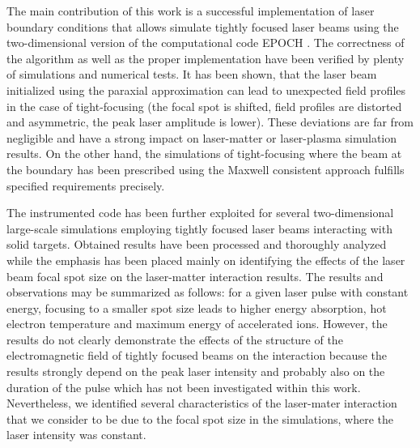 The main contribution of this work is a successful implementation of laser boundary conditions that allows simulate tightly focused laser beams using the two-dimensional version of the computational code EPOCH \cite{bennett}. The correctness of the algorithm as well as the proper implementation have been verified by plenty of simulations and numerical tests. It has been shown, that the laser beam initialized using the paraxial approximation can lead to unexpected field profiles in the case of tight-focusing (the focal spot is shifted, field profiles are distorted and asymmetric, the peak laser amplitude is lower). These deviations are far from negligible and have a strong impact on laser-matter or laser-plasma simulation results. On the other hand, the simulations of tight-focusing where the beam at the boundary has been prescribed using the Maxwell consistent approach \cite{Thiele2016} fulfills specified requirements precisely.

The instrumented code has been further exploited for several two-dimensional large-scale simulations employing tightly focused laser beams interacting with solid targets. Obtained results have been processed and thoroughly analyzed while the emphasis has been placed mainly on identifying the effects of the laser beam focal spot size on the laser-matter interaction results. The results and observations may be summarized as follows: for a given laser pulse with constant energy, focusing to a smaller spot size leads to higher energy absorption, hot electron temperature and maximum energy of accelerated ions. However, the results do not clearly demonstrate the effects of the structure of the electromagnetic field of tightly focused beams on the interaction because the results strongly depend on the peak laser intensity and probably also on the duration of the pulse which has not been investigated within this work. Nevertheless, we identified several characteristics of the laser-mater interaction that we consider to be due to the focal spot size in the simulations, where the laser intensity was constant.

